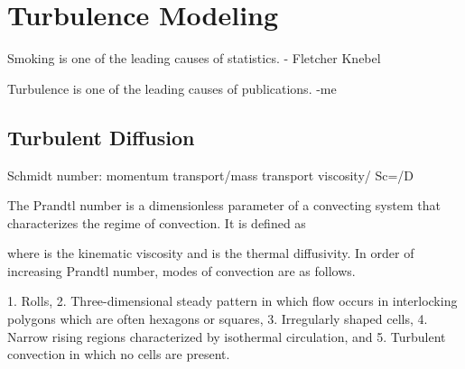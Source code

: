 \chapter{Turbulence Modeling}
Smoking is one of the leading causes of statistics.
  - Fletcher Knebel

Turbulence is one of the leading causes of publications.
 -me

\section{Turbulent Diffusion}

Schmidt number:
momentum transport/mass transport
viscosity/
\be
Sc=\nu/D
\ee




The Prandtl number is a dimensionless parameter of a convecting system that characterizes the regime of convection. It is defined as

where is the kinematic viscosity and is the thermal diffusivity. In order of increasing Prandtl number, modes of convection are as follows.

    1. Rolls,
    2. Three-dimensional steady pattern in which flow occurs in interlocking polygons which are often hexagons or squares,
    3. Irregularly shaped cells,
    4. Narrow rising regions characterized by isothermal circulation, and
    5. Turbulent convection in which no cells are present. 